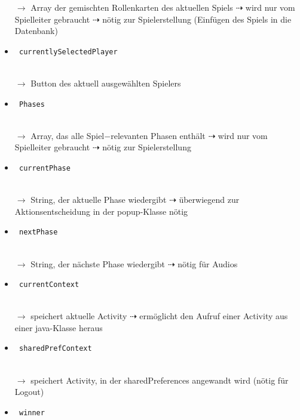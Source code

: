 \documentclass[12pt, a4paper]{article}
\begin{document}
\begin{itemize}
$\rightarrow$ Array der gemischten Rollenkarten des aktuellen Spiels $\dashrightarrow$ wird nur vom Spielleiter gebraucht $\dashrightarrow$ nötig zur Spielerstellung (Einfügen des Spiels in die Datenbank)
\item \begin{verbatim} currentlySelectedPlayer
\end{verbatim} \\
\vspace{-0.2 cm}
$\rightarrow$ Button des aktuell ausgewählten Spielers
\item \begin{verbatim} Phases
\end{verbatim} \\
\vspace{-0.2 cm}
$\rightarrow$ Array, das alle Spiel$-$relevanten Phasen enthält $\dashrightarrow$ wird nur vom Spielleiter gebraucht $\dashrightarrow$ nötig zur Spielerstellung
\item \begin{verbatim} currentPhase
\end{verbatim} \\ 
\vspace{-0.2 cm}
$\rightarrow$ String, der aktuelle Phase wiedergibt $\dashrightarrow$ überwiegend zur Aktionsentscheidung in der popup-Klasse nötig
\item \begin{verbatim} nextPhase
\end{verbatim} \\
\vspace{-0.2 cm}
$\rightarrow$ String, der nächste Phase wiedergibt $\dashrightarrow$ nötig für Audios
\item \begin{verbatim} currentContext
\end{verbatim} \\
\vspace{-0.2 cm}
$\rightarrow$ speichert aktuelle Activity $\dashrightarrow$ ermöglicht den Aufruf einer Activity aus einer java-Klasse heraus
\item \begin{verbatim} sharedPrefContext
\end{verbatim} \\
\vspace{-0.2 cm}
$\rightarrow$ speichert Activity, in der sharedPreferences angewandt wird (nötig für Logout)
\item \begin{verbatim} winner

\end{verbatim}
\end{itemize}
\end{document}
